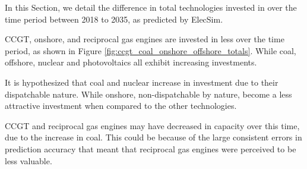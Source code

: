 \documentclass[final,3p,times,twocolumn,numbers]{elsarticle}
\begin{document}
In this Section, we detail the difference in total technologies invested in over the time period between 2018 to 2035, as predicted by ElecSim.

CCGT, onshore, and reciprocal gas engines are invested in less over the time period, as shown in Figure \ref{fig:ccgt_coal_onshore_offshore_totals}. While coal, offshore, nuclear and photovoltaics all exhibit increasing investments.

It is hypothesized that coal and nuclear increase in investment due to their dispatchable nature. While onshore, non-dispatchable by nature, become a less attractive investment when compared to the other technologies.

CCGT and reciprocal gas engines may have decreased in capacity over this time, due to the increase in coal. This could be because of the large consistent errors in prediction accuracy that meant that reciprocal gas engines were perceived to be less valuable.


\end{document}

